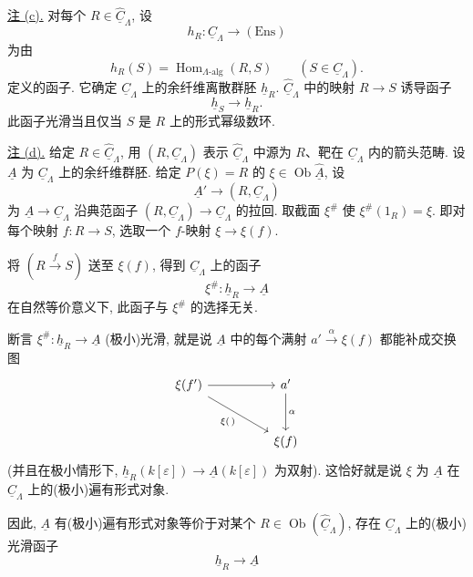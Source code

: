 \underline{注 (c).}
对每个 $R\in\widehat{\underline C}_\Lambda$, 设
\[
 h_R:\underline C_\Lambda\longrightarrow(\mathrm{Ens})
\]
为由
\[
 h_R(S)=\operatorname{Hom}_{\Lambda\text{-alg}}(R,S)
 \qquad(S\in\underline C_\Lambda).
\]
定义的函子. 它确定 $\underline C_\Lambda$ 上的余纤维离散群胚 $\underline h_R$.
$\widehat{\underline C}_\Lambda$ 中的映射 $R\longrightarrow S$ 诱导函子
\[
 \underline h_S\longrightarrow\underline h_R.
\]
此函子光滑当且仅当 $S$ 是 $R$ 上的形式幂级数环.


\underline{注 (d).}
给定 $R\in\widehat{\underline C}_\Lambda$, 用 $(R,\underline C_\Lambda)$
表示 $\widehat{\underline C}_\Lambda$ 中源为 $R$、靶在
$\underline C_\Lambda$ 内的箭头范畴.
设 $\underline A$ 为 $\underline C_\Lambda$ 上的余纤维群胚.
给定 $P(\xi)=R$ 的 $\xi\in\operatorname{Ob}\widehat{\underline A}$, 设
\[
 \underline A'\longrightarrow(R,\underline C_\Lambda)
\]
为 $\underline A\longrightarrow\underline C_\Lambda$
沿典范函子 $(R,\underline C_\Lambda)\longrightarrow\underline C_\Lambda$ 的拉回.
取截面 $\xi^\#$ 使 $\xi^\#(1_R)=\xi$.
即对每个映射 $f:R\longrightarrow S$, 选取一个 $f$-映射
$\xi\longrightarrow\xi(f)$.

将 $(R\xrightarrow{f}S)$ 送至 $\xi(f)$, 得到 $\underline C_\Lambda$ 上的函子
\[
 \xi^\#:\underline h_R\longrightarrow\underline A
\]
在自然等价意义下, 此函子与 $\xi^\#$ 的选择无关.

断言 $\xi^\#:\underline h_R\longrightarrow\underline A$
(极小)光滑, 就是说 $\underline A$ 中的每个满射
$a'\xrightarrow{\alpha}\xi(f)$ 都能补成交换图
\[
\begin{tikzcd}[row sep=large,column sep=huge]
 \xi(f') \arrow[r] \arrow[dr,"{\xi(\,)}"']
 & a' \arrow[d,"\alpha"]\\
 & \xi(f)
\end{tikzcd}
\]
(并且在极小情形下,
$\underline h_R(k[\varepsilon])\longrightarrow\underline A(k[\varepsilon])$ 为双射).
这恰好就是说 $\xi$ 为 $\underline A$ 在 $\underline C_\Lambda$
上的(极小)遍有形式对象.

因此, $\underline A$ 有(极小)遍有形式对象等价于对某个
$R\in\operatorname{Ob}(\widehat{\underline C}_\Lambda)$,
存在 $\underline C_\Lambda$ 上的(极小)光滑函子
\[
 \underline h_R\longrightarrow\underline A
\]


